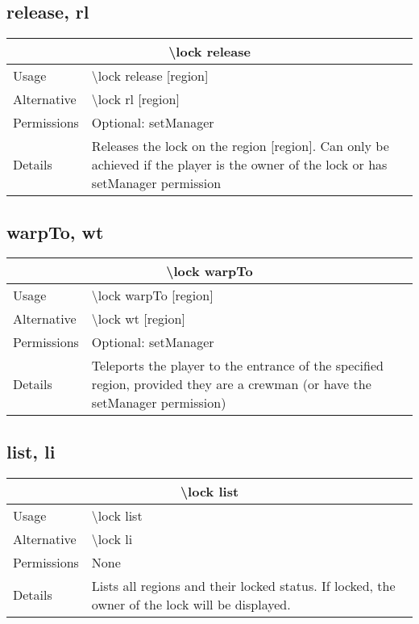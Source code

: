 \documentclass[a4paper,twoside,notitlepage,11pt]{article}
\begin{document}
\subsection{release, rl}
\begin{center}
\begin{tabular}{|p{2cm}|p{12.5cm}|} \hline
\multicolumn{2}{|c|}{\textbf{\textbackslash lock release}} \\ \hline
Usage       & \textbackslash lock release [region] \\ \hline
Alternative & \textbackslash lock rl [region] \\ \hline
Permissions & Optional: setManager \\ \hline
Details 	& Releases the lock on the region [region]. Can only be achieved if the player is the owner of the lock or has setManager permission \\ \hline
\end{tabular}
\end{center}

\subsection{warpTo, wt}
\begin{center}
\begin{tabular}{|p{2cm}|p{12.5cm}|} \hline
\multicolumn{2}{|c|}{\textbf{\textbackslash lock warpTo}} \\ \hline
Usage       & \textbackslash lock warpTo [region] \\ \hline
Alternative & \textbackslash lock wt [region] \\ \hline
Permissions & Optional: setManager \\ \hline
Details 	& Teleports the player to the entrance of the specified region, provided they are a crewman (or have the setManager permission)\\ \hline
\end{tabular}
\end{center}

\subsection{list, li}
\begin{center}
\begin{tabular}{|p{2cm}|p{12.5cm}|} \hline
\multicolumn{2}{|c|}{\textbf{\textbackslash lock list}} \\ \hline
Usage       & \textbackslash lock list \\ \hline
Alternative & \textbackslash lock li \\ \hline
Permissions & None \\ \hline
Details 	& Lists all regions and their locked status. If locked, the owner of the lock will be displayed. \\ \hline
\end{tabular}
\end{center}
\end{document}
